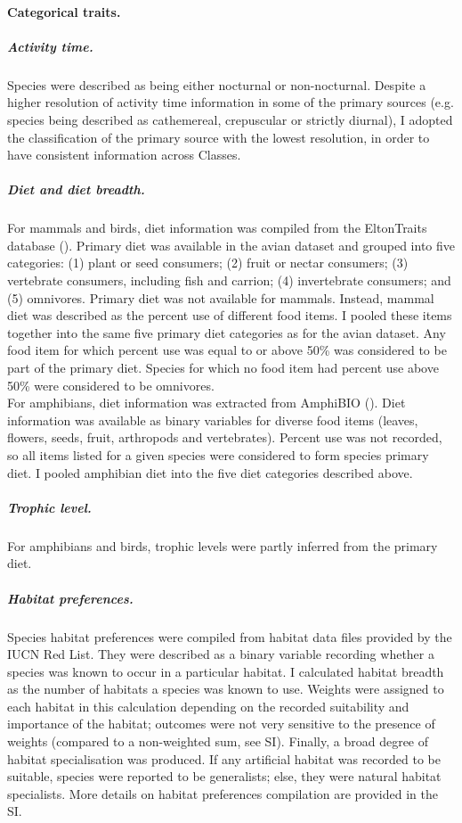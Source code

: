 \paragraph{Categorical traits.}
\subparagraph{Activity time.}
Species were described as being either nocturnal or non-nocturnal. Despite a higher resolution of activity time information in some of the primary sources (e.g. species being described as cathemereal, crepuscular or strictly diurnal), I adopted the classification of the primary source with the lowest resolution, in order to have consistent information across Classes.
\subparagraph{Diet and diet breadth.}
For mammals and birds, diet information was compiled from the EltonTraits database (\cite{Wilman2014}). Primary diet was available in the avian dataset and grouped into five categories: (1) plant or seed consumers; (2) fruit or nectar consumers; (3) vertebrate consumers, including fish and carrion; (4) invertebrate consumers; and (5) omnivores. Primary diet was not available for mammals. Instead, mammal diet was described as the percent use of different food items. I pooled these items together into the same five primary diet categories as for the avian dataset. Any food item for which percent use was equal to or above 50\% was considered to be part of the primary diet. Species for which no food item had percent use above 50\% were considered to be omnivores.\\ 
For amphibians, diet information was extracted from AmphiBIO (\cite{Oliveira2017}). Diet information was available as binary variables for diverse food items (leaves, flowers, seeds, fruit, arthropods and vertebrates). Percent use was not recorded, so all items listed for a given species were considered to form species primary diet. I pooled amphibian diet into the five diet categories described above.
\subparagraph{Trophic level.} For amphibians and birds, trophic levels were partly inferred from the primary diet. 
\subparagraph{Habitat preferences.}
Species habitat preferences were compiled from habitat data files provided by the IUCN Red List. They were described as a binary variable recording whether a species was known to occur in a particular habitat. I calculated habitat breadth as the number of habitats a species was known to use. Weights were assigned to each habitat in this calculation depending on the recorded suitability and importance of the habitat; outcomes were not very sensitive to the presence of weights (compared to a non-weighted sum, see SI). Finally, a broad degree of habitat specialisation was produced. If any artificial habitat was recorded to be suitable, species were reported to be generalists; else, they were natural habitat specialists. More details on habitat preferences compilation are provided in the SI. 

